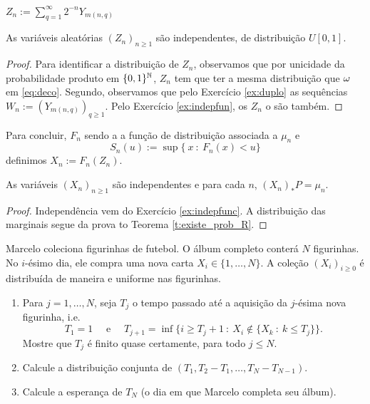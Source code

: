 $Z_n:=\sum_{q=1}^{\infty} 2^{-n} Y_{m(n,q)} $

\begin{lemma}
As variáveis aleatórias $(Z_n)_{n\ge 1}$ são independentes, de distribuição $U[0,1]$.
\end{lemma}

 \begin{proof}
Para identificar a distribuição de $Z_n$, observamos que por unicidade da probabilidade produto em $\{0,1\}^{{\mathbb N}}$, $Z_n$ tem que ter a mesma distribuição que
$\omega$ em \eqref{eq:deco}.
Segundo, observamos que pelo Exercício \ref{ex:duplo} as sequências $W_n:=(Y_{m(n,q)})_{q\ge 1}$.
Pelo Exercício \ref{ex:indepfun}, os $Z_n$ o são também.
\end{proof}


Para concluir, $F_n$ sendo a a função de distribuição associada a $\mu_n$ e
$$S_n(u):=\sup\{\ x  \ : \ F_n(x)<u \}$$
definimos $X_n:=F_n(Z_n)$.

\begin{proposition}
 As variáveis $(X_n)_{n\ge 1}$ são independentes e
 para cada $n$, $(X_n)_* P=\mu_n$.
 \end{proposition}

 \begin{proof}
  Independência vem do Exercício \ref{ex:indepfunc}. A distribuição das marginais segue da prova to Teorema \ref{t:existe_prob_R}.

 \end{proof}



\begin{exercise}
  Marcelo coleciona figurinhas de futebol.
  O álbum completo conter\'a $N$ figurinhas. No $i$-ésimo dia, ele compra uma nova carta $X_i \in \{1, \dots, N\}$.
  A cole\c{c}\~ao $(X_i)_{i \geq 0}$ é distribuída de maneira \iid e uniforme nas figurinhas.
  \begin{enumerate}[\quad a)]
  \item Para $j = 1, \dots, N$, seja $T_j$ o tempo passado até a aquisi\c{c}\~ao da $j$-ésima nova figurinha, i.e.
    \begin{equation}
      T_1 = 1 \quad \text{ e } \quad T_{j+1} = \inf\{i\ge T_{j}+1 \ : \  X_i\notin \{X_k\ : \ k\le T_j\} \}.
    \end{equation}
    Mostre que $T_j$ é finito quase certamente, para todo $j \leq N$.
  \item Calcule a distribuição conjunta de $(T_1, T_2 - T_1, \dots, T_N - T_{N-1})$.
  \item Calcule a esperança de $T_N$ (o dia em que Marcelo completa seu álbum).
  \end{enumerate}
\end{exercise}

